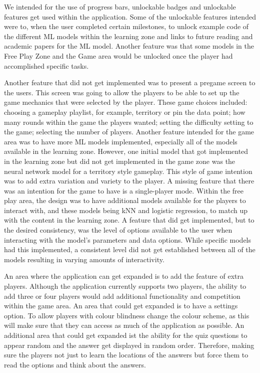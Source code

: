 		We intended for the use of progress bars, unlockable badges and unlockable features get used within the application. Some of the unlockable features intended were to, when the user completed certain milestones, to unlock example code of the different ML models within the learning zone and links to future reading and academic papers for the ML model. Another feature was that some models in the Free Play Zone and the Game area would be unlocked once the player had accomplished specific tasks.

		Another feature that did not get implemented was to present a pregame screen to the users. This screen was going to allow the players to be able to set up the game mechanics that were selected by the player. These game choices included: choosing a gameplay playlist, for example, territory or pin the data point;  how many rounds within the game the players wanted; setting the difficulty setting to the game; selecting the number of players. Another feature intended for the game area was to have more ML models implemented, especially all of the models available in the learning zone. However, one initial model that got implemented in the learning zone but did not get implemented in the game zone was the neural network model for a territory style gameplay. This style of game intention was to add extra variation and variety to the player. A missing feature that there was an intention for the game to have is a single-player mode. Within the free play area, the design was to have additional models available for the players to interact with, and these models being kNN and logistic regression, to match up with the content in the learning zone. A feature that did get implemented, but to the desired consistency, was the level of options available to the user when interacting with the model's parameters and data options. While specific models had this implemented, a consistent level did not get established between all of the models resulting in varying amounts of interactivity. 

		An area where the application can get expanded is to add the feature of extra players. Although the application currently supports two players, the ability to add three or four players would add additional functionality and competition within the game area. An area that could get expanded is to have a settings option. To allow players with colour blindness change the colour scheme, as this will make sure that they can access as much of the application as possible. An additional area that could get expanded ist the ability for the quiz questions to appear random and the answer get displayed in random order. Therefore, making sure the players not just to learn the locations of the answers but force them to read the options and think about the answers.

